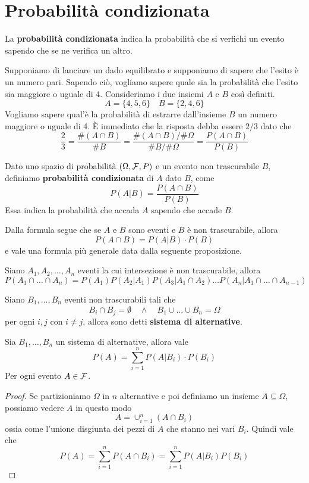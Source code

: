 \section{Probabilità condizionata}
La \textbf{probabilità condizionata} indica la probabilità che si verfichi un evento sapendo che
se ne verifica un altro.

\begin{example}
	Supponiamo di lanciare un dado equilibrato e supponiamo di sapere che l'esito è un numero
	pari. Sapendo ciò, vogliamo sapere quale sia la probabilità che l'esito sia maggiore o uguale
	di 4. Consideriamo i due insiemi $A$ e $B$ così definiti.
	\[ A = \{ 4, 5, 6 \} \quad B = \{ 2, 4, 6 \} \]
	Vogliamo sapere qual'è la probabilità di estrarre dall'insieme $B$ un numero maggiore o uguale
	di 4. \`E immediato che la risposta debba essere $2/3$ dato che
	\[
		\frac{2}{3} = \frac{\# (A \cap B)}{\# B} =
		\frac{\# (A \cap B) / \# \Omega}{\# B / \# \Omega} =
		\frac{P(A \cap B)}{P(B)}
	\]
\end{example}

\begin{definition}
	Dato uno spazio di probabilità $(\Omega, \mathcal{F}, P)$ e un evento non trascurabile $B$, definiamo
	\textbf{probabilità condizionata} di $A$ dato $B$, come
	\[ P(A | B) = \frac{P(A \cap B)}{P(B)} \]
	Essa indica la probabilità che accada $A$ sapendo che accade $B$.
\end{definition}

Dalla formula segue che se $A$ e $B$ sono eventi e $B$ è non trascurabile, allora
\[ P(A \cap B) = P(A | B) \cdot P(B) \]
e vale una formula più generale data dalla seguente proposizione.

\begin{proposition}
	Siano $A_1, A_2, \dots, A_n$ eventi la cui intersezione è non trascurabile, allora
	\[
		P(A_1 \cap  \dots \cap A_n) = P(A_1) P(A_2 | A_1) P(A_3 | A_1 \cap A_2)
		\dots P(A_n | A_1 \cap \dots \cap A_{n-1})
	\]
\end{proposition}

\begin{definition}
	Siano $B_1, \dots, B_n$ eventi non trascurabili tali che
	\[ B_i \cap B_j = \emptyset \quad \land \quad B_1 \cup \dots \cup B_n = \Omega \]
	per ogni $i,j$ con $i \neq j$, allora sono detti \textbf{sistema di alternative}.
\end{definition}

\begin{theorem}[Fattorizzazione]\label{th: fattorizzazione}
	Sia $B_1, \dots, B_n$ un sistema di alternative, allora vale
	\[ P(A) = \sum_{i=1}^n P(A | B_i) \cdot P(B_i) \]
	Per ogni evento $A \in \mathcal{F}$.
	\begin{proof}
		Se partizioniamo $\Omega$ in $n$ alternative e poi definiamo un insieme
		$A \subseteq \Omega$, possiamo vedere $A$ in questo modo
		\[ A = \cup_{i=1}^n (A \cap B_i) \]
		ossia come l'unione disgiunta dei pezzi di $A$ che stanno nei vari $B_i$. Quindi vale che
		\[ P(A) = \sum_{i=1}^n P(A \cap B_i) = \sum_{i=1}^n P(A | B_i) P(B_i) \]
	\end{proof}
\end{theorem}

